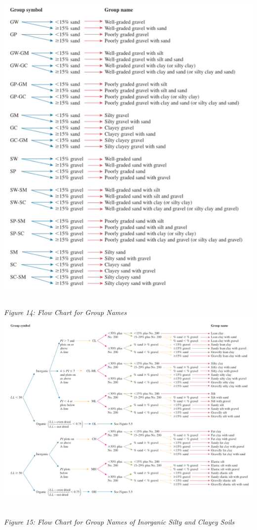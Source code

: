 \documentclass{article}
\begin{document}
\begin{center}
\includegraphics*[scale=0.7]{fig5.png}
\emph{\\Figure 14: Flow Chart for Group Names\\}
\includegraphics*[scale=0.8]{fig6.png}
\emph{\\Figure 15: Flow Chart for Group Names of Inorganic Silty and Clayey Soils\\}
\end{center}
\newpage
\end{document}
